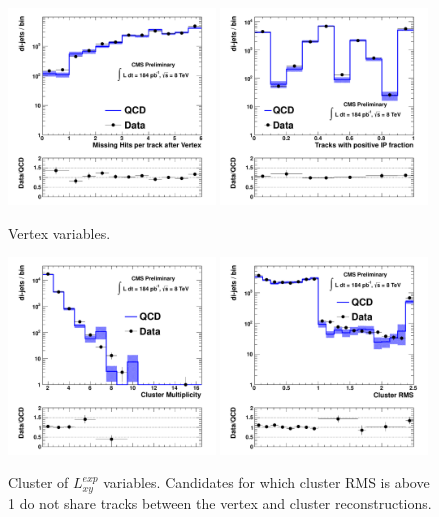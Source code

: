 \begin{figure}[htbp]
\includegraphics[width=0.49\textwidth]{plots/control/ctrl_NAvgMissHitsAfterVert.pdf}
\includegraphics[width=0.49\textwidth]{plots/control/ctrl_Posip2dFrac.pdf}

\caption{Vertex variables. \label{fig:vertex}}
\end{figure}


\begin{figure}[htbp]
\centering
\includegraphics[width=0.49\textwidth]{plots/control/ctrl_clrN.pdf}
\includegraphics[width=0.49\textwidth]{plots/control/ctrl_clrRMS.pdf}

\caption{Cluster of $L_{xy}^{exp}$ variables. Candidates for which cluster RMS is above 1 do not share
tracks between the vertex and cluster reconstructions. \label{fig:cluster}}
\end{figure}

